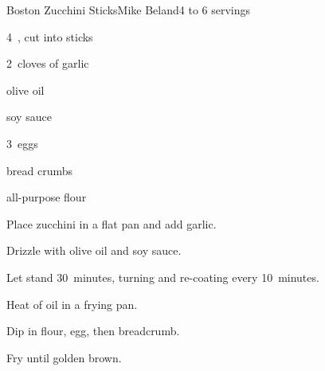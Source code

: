 \begin{recipe}{Boston Zucchini Sticks\UNTESTED}{Mike Beland}{4 to 6 servings}

\begin{ingredients}
\item 4~, cut into sticks
\item 2~cloves of garlic
\item olive oil
\item soy sauce
\item 3~eggs
\item bread crumbs
\item all-purpose flour
\end{ingredients}

\begin{directions}
\item Place zucchini in a flat pan and add garlic.
\item Drizzle with olive oil and soy sauce.
\item Let stand 30~minutes, turning and re-coating every 10~minutes.
\item Heat \inch{\quarter} of oil in a frying pan.
\item Dip in flour, egg, then breadcrumb.
\item Fry until golden brown.
\end{directions}

\end{recipe}

